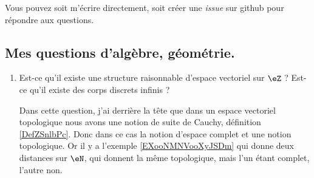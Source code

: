 Vous pouvez soit m'écrire directement, soit créer une \emph{issue} sur github pour répondre aux questions.

\subsection{Mes questions d'algèbre, géométrie.}

\begin{enumerate}
    \item
        Est-ce qu'il existe une structure raisonnable d'espace vectoriel sur \( \eZ\) ? Est-ce qu'il existe des corps discrets infinis ? 

        Dans cette question, j'ai derrière la tête que dans un espace vectoriel topologique nous avons une notion de suite de Cauchy, définition \ref{DefZSnlbPc}. Donc dans ce cas la notion d'espace complet et une notion topologique. Or il y a l'exemple \ref{EXooNMNVooXyJSDm} qui donne deux distances sur \( \eN\), qui donnent la même topologique, mais l'un étant complet, l'autre non.


\end{enumerate}
